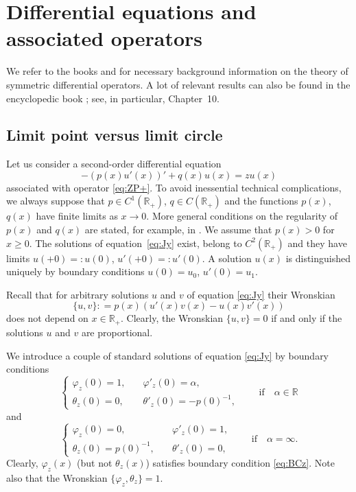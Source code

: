 \documentclass[10pt,a4paper]{amsart}
\numberwithin{equation}{section}
\begin{document}
\section{Differential equations and associated operators}\label{section2}

 We refer to the books \cite[Section~17]{Nai} and \cite[Section~X.1]{RS} for necessary background information on the theory of symmetric differential operators. A lot of relevant results can also be found in the encyclopedic book \cite{Zettl};
 see, in particular, Chapter~10.

\subsection{Limit point versus limit circle}\label{section2.1}

Let us consider a second-order differential equation
\begin{equation}
- (p(x) u' (x))' + q(x) u(x)=z u(x)
 \label{eq:Jy}\end{equation}
 associated with operator \eqref{eq:ZP+}. To avoid inessential technical complications, we
 always suppose that $ p \in C^1 ({\mathbb R}_{+})$, $ q \in C ({\mathbb R}_{+})$ and the functions $p(x)$, $q(x)$ have finite limits as $x\to 0$.
 More general conditions on the regularity of $p(x)$ and $q(x)$ are stated, for example, in \cite[Section~15]{Nai}. We assume that $p(x)> 0$ for $x\geq 0$. The solutions of equation~\eqref{eq:Jy} exist, belong to $C^2 ({\mathbb R}_{+})$ and they have limits $u(+0)= : u(0)$, $u'(+0)= : u'(0)$. A solution $u(x)$ is distinguished uniquely by boundary conditions $u(0)=u_{0}$, $u'(0)=u_{1}$.

Recall that for arbitrary solutions $u$ and $v$ of equation \eqref{eq:Jy} their Wronskian
 \[
\{ u, v \} : = p(x) (u' (x) v (x)- u (x) v' (x))
\]
does not depend on $x\in{\mathbb R}_{+}$. Clearly, the Wronskian $\{ u, v \} =0$ if and only if the solutions $u$ and $v$ are proportional.

We introduce a couple of standard solutions of equation \eqref{eq:Jy} by boundary conditions
 \begin{equation}
 \begin{cases}
\varphi_{z}(0)= 1,&\quad \varphi'_{z}(0)=\alpha,
\\
\theta_{z}(0)= 0,& \quad \theta'_{z}(0)=- p(0)^{-1},
 \end{cases} \qquad \mbox{if} \quad \alpha\in{\mathbb R}
 \label{eq:Pz}\end{equation}
 and
 \begin{equation}
 \begin{cases}
\varphi_{z}(0)= 0,&\quad \varphi'_{z}(0)=1,
\\
\theta_{z}(0)= p(0)^{-1},&\quad \theta'_{z}(0)= 0,
 \end{cases} \qquad \mbox{if}\quad \alpha=\infty.
\label{eq:Pzi}\end{equation}
 Clearly, $\varphi_{z} (x)$ (but not $\theta_{z} (x)$) satisfies boundary condition \eqref{eq:BCz}. Note also that the Wronskian
 $\{\varphi_{z}, \theta_{z}\}=1$.
\end{document}
